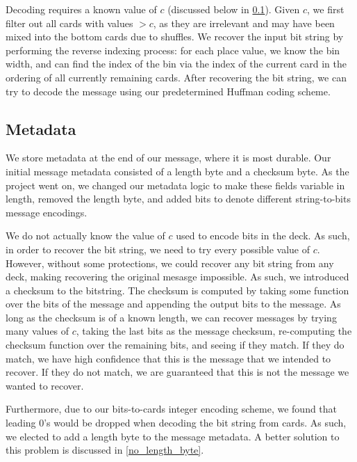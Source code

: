 \documentclass[titlepage]{article}
\begin{document}
Decoding requires a known value of $c$ (discussed below in \cref{metadata}). Given $c$, we first filter out all cards with values $> c$, as they are irrelevant and may have been mixed into the bottom cards due to shuffles. We recover the input bit string by performing the reverse indexing process: for each place value, we know the bin width, and can find the index of the bin via the index of the current card in the ordering of all currently remaining cards. After recovering the bit string, we can try to decode the message using our predetermined Huffman coding scheme.

\subsection{Metadata} \label{metadata}
We store metadata at the end of our message, where it is most durable. Our initial message metadata consisted of a length byte and a checksum byte. As the project went on, we changed our metadata logic to make these fields variable in length, removed the length byte, and added bits to denote different string-to-bits message encodings.

We do not actually know the value of $c$ used to encode bits in the deck. As such, in order to recover the bit string, we need to try every possible value of $c$. However, without some protections, we could recover any bit string from any deck, making recovering the original mesasge impossible. As such, we introduced a checksum to the bitstring. The checksum is computed by taking some function over the bits of the message and appending the output bits to the message. As long as the checksum is of a known length, we can recover messages by trying many values of $c$, taking the last bits as the message checksum, re-computing the checksum function over the remaining bits, and seeing if they match. If they do match, we have high confidence that this is the message that we intended to recover. If they do not match, we are guaranteed that this is not the message we wanted to recover.

Furthermore, due to our bits-to-cards integer encoding scheme, we found that leading 0's would be dropped when decoding the bit string from cards. As such, we elected to add a length byte to the message metadata. A better solution to this problem is discussed in \cref{no_length_byte}.
\end{document}
